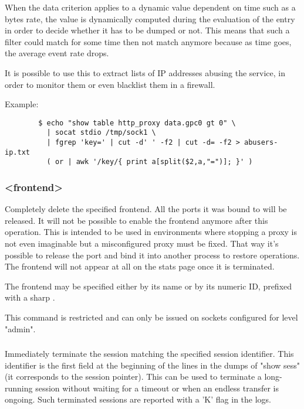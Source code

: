   When the data criterion applies to a dynamic value dependent on time such as
  a bytes rate, the value is dynamically computed during the evaluation of the
  entry in order to decide whether it has to be dumped or not. This means that
  such a filter could match for some time then not match anymore because as
  time goes, the average event rate drops.

  It is possible to use this to extract lists of IP addresses abusing the
  service, in order to monitor them or even blacklist them in a firewall.

  Example:
  \begin{verbatim}
        $ echo "show table http_proxy data.gpc0 gt 0" \
          | socat stdio /tmp/sock1 \
          | fgrep 'key=' | cut -d' ' -f2 | cut -d= -f2 > abusers-ip.txt
          ( or | awk '/key/{ print a[split($2,a,"=")]; }' )
  \end{verbatim}

\subsubsection[shutdown frontend]{ <frontend>}

  Completely delete the specified frontend. All the ports it was bound to will
  be released. It will not be possible to enable the frontend anymore after
  this operation. This is intended to be used in environments where stopping a
  proxy is not even imaginable but a misconfigured proxy must be fixed. That
  way it's possible to release the port and bind it into another process to
  restore operations. The frontend will not appear at all on the stats page
  once it is terminated.

  The frontend may be specified either by its name or by its numeric ID,
  prefixed with a sharp \chr{\#}.

  This command is restricted and can only be issued on sockets configured for
  level "admin".

\subsubsection[shutdown session <id>]{}

  Immediately terminate the session matching the specified session identifier.
  This identifier is the first field at the beginning of the lines in the dumps
  of "show sess" (it corresponds to the session pointer). This can be used to
  terminate a long-running session without waiting for a timeout or when an
  endless transfer is ongoing. Such terminated sessions are reported with a 'K'
  flag in the logs.

